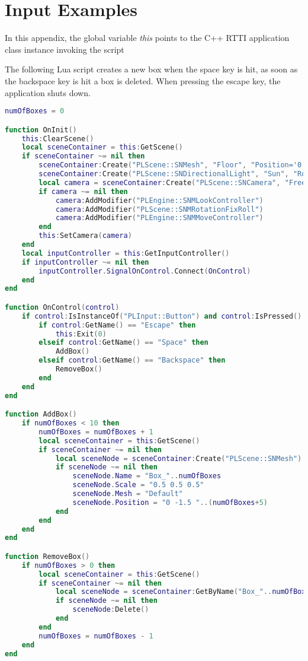 \chapter{Input Examples}
In this appendix, the global variable \emph{this} points to the C++ \ac{RTTI} application class instance invoking the script 

The following Lua script creates a new box when the space key is hit, as soon as the backspace key is hit a box is deleted. When pressing the escape key, the application shuts down.
\begin{lstlisting}[language=lua]
numOfBoxes = 0

function OnInit()
	this:ClearScene()
	local sceneContainer = this:GetScene()
	if sceneContainer ~= nil then
		sceneContainer:Create("PLScene::SNMesh", "Floor", "Position='0 -2.1 5' Scale='4 0.1 4' Rotation='0 180 0' Mesh='Default'")
		sceneContainer:Create("PLScene::SNDirectionalLight", "Sun", "Rotation='45 0 0'")
		local camera = sceneContainer:Create("PLScene::SNCamera", "FreeCamera")
		if camera ~= nil then
			camera:AddModifier("PLEngine::SNMLookController")
			camera:AddModifier("PLScene::SNMRotationFixRoll")
			camera:AddModifier("PLEngine::SNMMoveController")
		end
		this:SetCamera(camera)
	end
	local inputController = this:GetInputController()
	if inputController ~= nil then
		inputController.SignalOnControl.Connect(OnControl)
	end
end

function OnControl(control)
	if control:IsInstanceOf("PLInput::Button") and control:IsPressed() then
		if control:GetName() == "Escape" then
			this:Exit(0)
		elseif control:GetName() == "Space" then
			AddBox()
		elseif control:GetName() == "Backspace" then
			RemoveBox()
		end
	end
end

function AddBox()
	if numOfBoxes < 10 then
		numOfBoxes = numOfBoxes + 1
		local sceneContainer = this:GetScene()
		if sceneContainer ~= nil then
			local sceneNode = sceneContainer:Create("PLScene::SNMesh")
			if sceneNode ~= nil then
				sceneNode.Name = "Box_"..numOfBoxes
				sceneNode.Scale = "0.5 0.5 0.5"
				sceneNode.Mesh = "Default"
				sceneNode.Position = "0 -1.5 "..(numOfBoxes+5)
			end
		end
	end
end

function RemoveBox()
	if numOfBoxes > 0 then
		local sceneContainer = this:GetScene()
		if sceneContainer ~= nil then
			local sceneNode = sceneContainer:GetByName("Box_"..numOfBoxes)
			if sceneNode ~= nil then
				sceneNode:Delete()
			end
		end
		numOfBoxes = numOfBoxes - 1
	end
end
\end{lstlisting}
